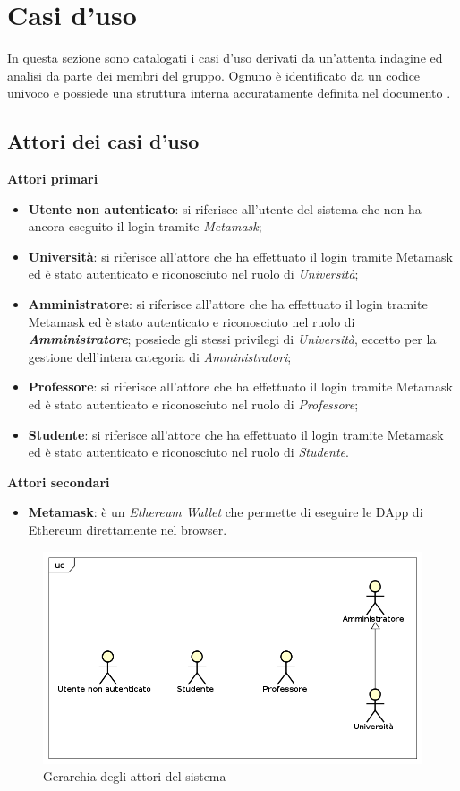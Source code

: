 \section{Casi d'uso}
In questa sezione sono catalogati i casi d'uso derivati da un'attenta indagine ed analisi da parte dei membri del gruppo. Ognuno è identificato da un codice univoco e possiede una struttura interna accuratamente definita nel documento \NdP{}.
\subsection{Attori dei casi d'uso}
\textbf{Attori primari}
	\begin{itemize}
		\item \textbf{Utente non autenticato}: si riferisce all'utente del sistema che non ha ancora eseguito il login tramite \emph{Metamask};
		\item \textbf{Università}: si riferisce all'attore che ha effettuato il login tramite Metamask ed è stato autenticato e riconosciuto nel ruolo di \emph{Università};
		\item \textbf{Amministratore}: si riferisce all'attore che ha effettuato il login tramite Metamask ed è stato autenticato e riconosciuto nel ruolo di \emph\textbf{{Amministratore}}; possiede gli stessi privilegi di \emph{Università}, eccetto per la gestione dell'intera categoria di \emph{Amministratori};
		\item \textbf{Professore}: si riferisce all'attore che ha effettuato il login tramite Metamask ed è stato autenticato e riconosciuto nel ruolo di \emph{Professore};
		\item \textbf{Studente}: si riferisce all'attore che ha effettuato il login tramite Metamask ed è stato autenticato e riconosciuto nel ruolo di \emph{Studente}.
	\end{itemize}

\textbf{Attori secondari}
	\begin{itemize}
		\item \textbf{Metamask}: è un \emph{Ethereum Wallet} che permette di eseguire le DApp di Ethereum direttamente nel browser.
	\end{itemize}
\begin{figure} [H]
	\centering
	\includegraphics[scale=0.4]{./img/Attori.png}
	\caption{Gerarchia degli attori del sistema }\label{}
\end{figure}

